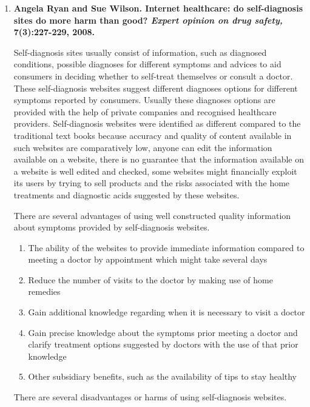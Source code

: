 \documentclass[]{article}
\begin{document}
\begin{enumerate}
\item {\textbf{Angela Ryan and Sue Wilson. Internet healthcare: do self-diagnosis sites do more harm than good? \textit{Expert opinion on drug safety,} 7(3):227-229, 2008.}}

Self-diagnosis sites usually consist of information, such as diagnosed conditions, possible diagnoses for different symptoms and advices to aid consumers in deciding whether to self-treat themselves or consult a doctor. These self-diagnosis websites suggest different diagnoses options for different symptoms reported by consumers. Usually these diagnoses options are provided with the help of private companies and recognised healthcare providers. Self-diagnosis websites were identified as different compared to the traditional text books because  accuracy and quality of content available in such websites are comparatively low, anyone can edit the information available on a website, there is no guarantee that the information available on a website is well edited and checked, some websites might financially exploit its users by trying to sell products and the risks associated with the home treatments and diagnostic acids suggested by these websites. 

There are several advantages of using well constructed quality information about symptoms provided by self-diagnosis websites. 

\begin{enumerate}
	\item The ability of the websites to provide immediate information compared to meeting a doctor by appointment which might take several days
	 
	\item Reduce the number of visits to the doctor by making use of home remedies
	
	\item Gain additional knowledge regarding when it is necessary to visit a doctor
	
	\item Gain precise knowledge about the symptoms prior meeting a doctor and clarify treatment options suggested by doctors with the use of that prior knowledge 
	
	\item Other subsidiary benefits, such as the availability of tips to stay healthy  
	
\end{enumerate}

There are several disadvantages or harms of using self-diagnosis websites. 


\end{enumerate}
\end{document}
